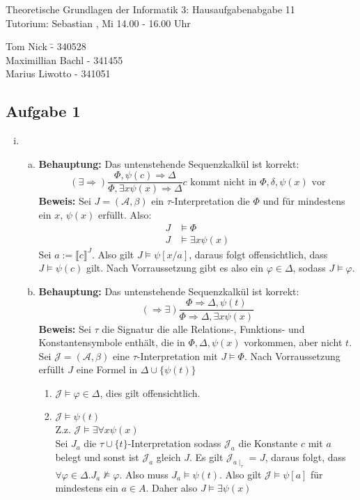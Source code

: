 \documentclass[a4paper,10pt]{article}
\begin{document}
\begin{center}
\Large{Theoretische Grundlagen der Informatik 3: Hausaufgabenabgabe 11} \\
\large{Tutorium: Sebastian , Mi 14.00 - 16.00 Uhr}
\end{center}
\begin{tabbing}
Tom Nick \hspace{2cm}\= - 340528\\
Maximillian Bachl \> - 341455 \\
Marius Liwotto\> -  341051
\end{tabbing}
\subsection*{Aufgabe 1}
\begin{enumerate}[(i)]
	\item
	\begin{enumerate}[a)]
	
		\item \textbf{Behauptung: } Das untenstehende Sequenzkalkül ist korrekt:
		\[ (\exists \Rightarrow) \frac{\Phi, \psi(c) \Rightarrow \Delta}{\Phi, \exists x \psi(x)\Rightarrow \Delta} c \text{ kommt nicht in $\Phi,\delta,\psi(x)$ vor}\]
		\textbf{Beweis:} 
		Sei $J = (\mathcal{A},\beta)$ ein $\tau$-Interpretation die $\Phi$ und für mindestens ein $x$, $\psi(x)$ erfüllt. Also:
		\begin{align*}
			J &\vDash \Phi \\
			J &\vDash \exists x \psi(x)
		\end{align*}
		Sei $a := \llbracket c \rrbracket^{J}$. Also gilt $J \vDash \psi[x/a]$, daraus folgt offensichtlich, dass $J \vDash \psi(c)$ gilt. Nach Vorraussetzung gibt es also ein $\varphi \in \Delta$, sodass $J \vDash \varphi$.
		\item \textbf{Behauptung: } Das untenstehende Sequenzkalkül ist korrekt:
		\[ (\Rightarrow \exists) \frac{\Phi \Rightarrow \Delta,\psi(t)}{\Phi \Rightarrow \Delta, \exists x \psi (x)} \]
		\textbf{Beweis:} 
		Sei $\tau$ die Signatur die alle Relations-, Funktions- und Konstantensymbole enthält, die in $\Phi, \Delta, \psi(x)$ vorkommen, aber nicht $t$.
		Sei $\mathcal{J} = (\mathcal{A},\beta)$ eine $\tau$-Interpretation mit $J \vDash \Phi$.
		Nach Vorraussetzung erfüllt $J$ eine Formel in $\Delta \cup \{ \psi(t) \}$
		\begin{enumerate}
			\item $\mathcal{J} \vDash \varphi \in \Delta$, dies gilt offensichtlich.
			\item $\mathcal{J} \vDash \psi(t)$ \\
			Z.z. $\mathcal{J} \vDash \exists \forall x \psi(x)$ \\
			Sei $J_a$ die $\tau \cup \{t\}$-Interpretation sodass $\mathcal{J}_a$ die Konstante $c$ mit $a$ belegt und sonst ist $\mathcal{J}_a$ gleich $J$.
			Es gilt $\mathcal{J}_{a\mid_\tau}$ = $J$, daraus folgt, dass $\forall \varphi \in \Delta.J_a \not \vDash \varphi$. Also muss $J_a \vDash \psi(t)$.
			Also gilt $\mathcal{J} \vDash \psi[a]$ für mindestens ein $a \in A$. Daher also $J \vDash \exists \psi (x)$
		\end{enumerate}
	\end{enumerate}
\end{enumerate}
\end{document}
